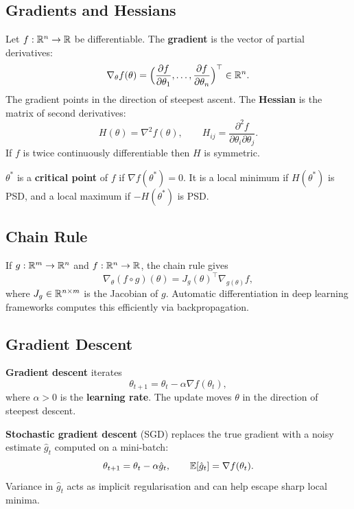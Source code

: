 \subsection*{Gradients and Hessians}

Let $f : \mathbb{R}^n \to \mathbb{R}$ be differentiable.  The \textbf{gradient}
 is the vector of partial derivatives:
\[
    \nabla_\theta f(\theta)
    = \Bigl(\frac{\partial f}{\partial \theta_1}, \ldots,
             \frac{\partial f}{\partial \theta_n}\Bigr)^\top \in \mathbb{R}^n.
\]
The gradient points in the direction of steepest ascent.  The
\textbf{Hessian} is the matrix of second derivatives:
\[
    H(\theta) = \nabla^2 f(\theta), \qquad
    H_{ij} = \frac{\partial^2 f}{\partial \theta_i \partial \theta_j}.
\]
If $f$ is twice continuously differentiable then $H$ is symmetric.

\begin{definition}
$\theta^*$ is a \textbf{critical point} of $f$ if $\nabla f(\theta^*)=0$.
It is a local minimum if $H(\theta^*)$ is PSD, and a local maximum if
$-H(\theta^*)$ is PSD.
\end{definition}

\subsection*{Chain Rule}

If $g: \mathbb{R}^m \to \mathbb{R}^n$ and $f: \mathbb{R}^n \to \mathbb{R}$, the chain rule gives
\[
    \nabla_\theta (f \circ g)(\theta)
    = J_g(\theta)^\top \nabla_{g(\theta)} f,
\]
where $J_g \in \mathbb{R}^{n \times m}$ is the Jacobian of $g$.  Automatic
differentiation in deep learning frameworks computes this efficiently via
backpropagation.

\subsection*{Gradient Descent}

\textbf{Gradient descent} iterates
\[
    \theta_{t+1} = \theta_t - \alpha \nabla f(\theta_t),
\]
where $\alpha > 0$ is the \textbf{learning rate}.  The update moves
$\theta$ in the direction of steepest descent.

\textbf{Stochastic gradient descent} (SGD) replaces the true gradient with
a noisy estimate $\hat{g}_t$ computed on a mini-batch:
\[
    \theta_{t+1} = \theta_t - \alpha \hat{g}_t, \qquad
    \operatorname{\mathbb{E}}[\hat{g}_t] = \nabla f(\theta_t).
\]
Variance in $\hat{g}_t$ acts as implicit regularisation and can help escape
sharp local minima.

